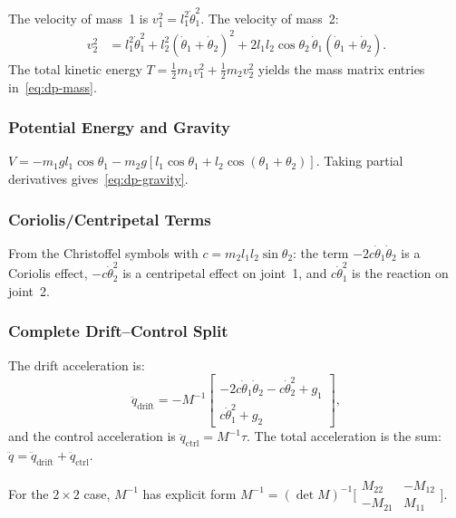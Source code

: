 \documentclass[11pt]{article}
\begin{document}
The velocity of mass~1 is $v_1^2 = l_1^2\dot\theta_1^2$.
The velocity of mass~2:
\begin{align}
v_2^2 &= l_1^2\dot\theta_1^2 + l_2^2(\dot\theta_1+\dot\theta_2)^2 + 2l_1l_2\cos\theta_2\,\dot\theta_1(\dot\theta_1+\dot\theta_2).
\end{align}
The total kinetic energy $T = \frac{1}{2}m_1v_1^2 + \frac{1}{2}m_2v_2^2$ yields the mass matrix entries in~\eqref{eq:dp-mass}.

\subsubsection{Potential Energy and Gravity}

$V = -m_1gl_1\cos\theta_1 - m_2g[l_1\cos\theta_1 + l_2\cos(\theta_1+\theta_2)]$.
Taking partial derivatives gives~\eqref{eq:dp-gravity}.

\subsubsection{Coriolis/Centripetal Terms}

From the Christoffel symbols with $c = m_2l_1l_2\sin\theta_2$:
the term $-2c\dot\theta_1\dot\theta_2$ is a Coriolis effect,
$-c\dot\theta_2^2$ is a centripetal effect on joint~1,
and $c\dot\theta_1^2$ is the reaction on joint~2.

\subsubsection{Complete Drift--Control Split}

The drift acceleration is:
\begin{equation}
\ddot{q}_{\mathrm{drift}} = -M^{-1}\begin{bmatrix}
-2c\dot\theta_1\dot\theta_2 - c\dot\theta_2^2 + g_1 \\
c\dot\theta_1^2 + g_2
\end{bmatrix},
\end{equation}
and the control acceleration is $\ddot{q}_{\mathrm{ctrl}} = M^{-1}\tau$.
The total acceleration is the sum: $\ddot{q} = \ddot{q}_{\mathrm{drift}} + \ddot{q}_{\mathrm{ctrl}}$.

For the $2\times 2$ case, $M^{-1}$ has explicit form $M^{-1} = (\det M)^{-1}\bigl[\begin{smallmatrix}M_{22}&-M_{12}\\-M_{21}&M_{11}\end{smallmatrix}\bigr]$.
\end{document}
